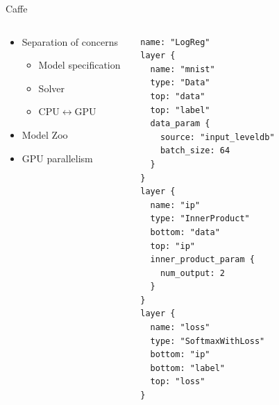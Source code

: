 \documentclass[pdf]{beamer}
\begin{document}
\begin{frame}[fragile]{Caffe \cite{jia2014caffe}}
    \begin{columns}
        \begin{column}{0.3\textwidth}
            \begin{itemize}
                \item Separation of concerns
                    \begin{itemize}
                        \item Model specification
                        \item Solver
                        \item CPU$\leftrightarrow$GPU
                    \end{itemize}
                \item Model Zoo
                \item GPU parallelism
            \end{itemize}
        \end{column}
        \begin{column}{0.25\textwidth}
            \begin{verbatim}
name: "LogReg"
layer {
  name: "mnist"
  type: "Data"
  top: "data"
  top: "label"
  data_param {
    source: "input_leveldb"
    batch_size: 64
  }
}
layer {
  name: "ip"
  type: "InnerProduct"
  bottom: "data"
  top: "ip"
  inner_product_param {
    num_output: 2
  }
}
layer {
  name: "loss"
  type: "SoftmaxWithLoss"
  bottom: "ip"
  bottom: "label"
  top: "loss"
}
            \end{verbatim}
        \end{column}
        \begin{column}{0.35\textwidth}
            \begin{figure}[htpb]
                \centering

\end{figure}
\end{column}
\end{columns}
\end{frame}
\end{document}
